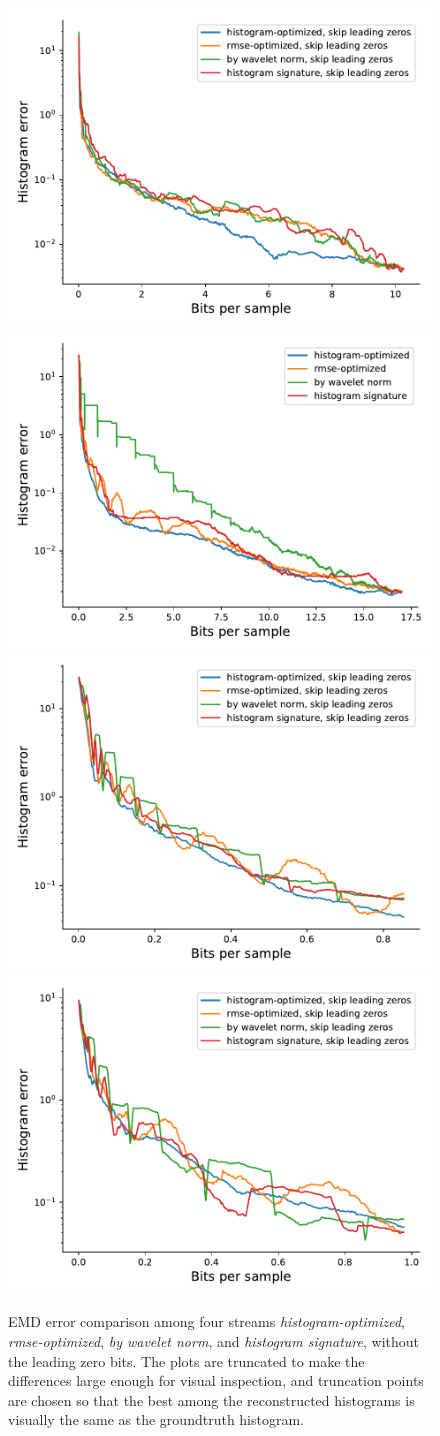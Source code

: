 \begin{figure}
	\centering
	{\includegraphics[width=0.48\linewidth]{img/histogram/skip-leading-zeros/boiler-histogram.pdf}}
	{\includegraphics[width=0.48\linewidth]{img/histogram/miranda-diffusivity-histogram.pdf}}
	{\includegraphics[width=0.48\linewidth]{img/histogram/skip-leading-zeros/miranda-diffusivity-histogram.pdf}}
	{\includegraphics[width=0.48\linewidth]{img/histogram/skip-leading-zeros/turbulence-histogram.pdf}}
	\caption{EMD error comparison among four streams \emph{histogram-optimized},
	\emph{rmse-optimized}, \emph{by wavelet norm}, and \emph{histogram signature}, without the leading
	zero bits. The plots are truncated to make the differences large enough for visual inspection, and
	truncation points are chosen so that the best among the reconstructed histograms is visually the
	same as the groundtruth histogram. }
	\label{fig:histogram-stream-comparison}
\end{figure}

